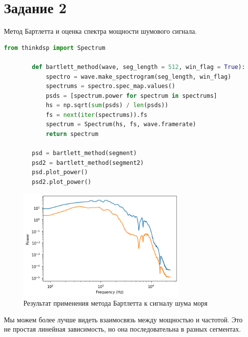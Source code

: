 \documentclass[a4paper, 12pt]{report}
\begin{document}
	\section{Задание 2}
	Метод Бартлетта и оценка спектра мощности шумового сигнала.
	\begin{lstlisting}[language=Python,caption=Метод Бартлетта]
		from thinkdsp import Spectrum

		def bartlett_method(wave, seg_length = 512, win_flag = True):
			spectro = wave.make_spectrogram(seg_length, win_flag)
			spectrums = spectro.spec_map.values()
			psds = [spectrum.power for spectrum in spectrums]
			hs = np.sqrt(sum(psds) / len(psds))
			fs = next(iter(spectrums)).fs
			spectrum = Spectrum(hs, fs, wave.framerate)
			return spectrum

		psd = bartlett_method(segment)
		psd2 = bartlett_method(segment2)
		psd.plot_power()
		psd2.plot_power()
	\end{lstlisting}
	\begin{figure}[H]
		\centering
		\includegraphics[width=0.75\textwidth]{bartl1.png}
		\caption{Результат применения метода Бартлетта к сигналу шума моря}
		\label{fig:bartl1}
	\end{figure}
	Мы можем более лучше видеть взаимосвязь между мощностью и частотой. Это не простая линейная зависимость, но она последовательна в разных сегментах.	
\end{document}
